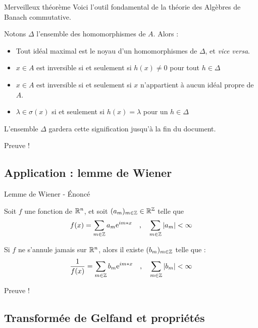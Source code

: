 \documentclass[11pt, xcolor=table]{beamer}
\begin{document}
\begin{frame}{Merveilleux théorème}
    Voici l'outil fondamental de la théorie des Algèbres de Banach commutative.

       \begin{myth}
           Notons $\Delta$ l'ensemble des homomorphismes de $A$. Alors :
           \begin{itemize}[<+->]
               \item Tout idéal maximal est le noyau d'un homomorphismes de $\Delta$, et \emph{vice versa}.
               \item $x \in A$ est inversible si et seulement si $h(x) \not = 0$ pour tout $h \in \Delta$
               \item $x \in A$ est inversible si et seulement si $x$ n'appartient à aucun idéal propre de $A$.
               \item $\lambda \in \sigma(x) $  si et seulement si $h(x) = \lambda $ pour un $h \in \Delta$
           \end{itemize}

           L'ensemble $\Delta$ gardera cette signification jusqu'à la fin du document.
       \end{myth} 
       \pause
       Preuve !
\end{frame}

\subsection{Application : lemme de Wiener }
\begin{frame}{Lemme de Wiener - Énoncé}
    \begin{myth}
        Soit $f$ une fonction de $\mathbb{R}^n$, et soit $(a_m)_{m \in \mathbb{Z}} \in \mathbb{R}^{\mathbb{Z}} $ telle que 
        \[
            f(x) = \sum_{m\in \mathbb{Z} } a_m \textrm{e}^{im*x} \quad \text{,} \quad \sum_{m \in \mathbb{Z} } | a_m | < \infty 
        \]

        Si $f$ ne s'annule jamais sur $\mathbb{R}^n$, alors il existe $(b_m)_{m \in \mathbb{Z}} $ telle que :
        \[
            \frac{1}{f(x)} = \sum_{m \in \mathbb{Z}} b_m \textrm{e}^{im*x} \quad \text{,} \quad \sum_{m \in \mathbb{Z} } | b_m | < \infty 
        \]
    \end{myth}

    \pause 
    Preuve !
\end{frame}

\subsection{Transformée de Gelfand et propriétés}
\end{document}
